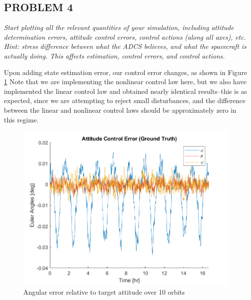 \subsection{PROBLEM 4}
\textit{Start plotting all the relevant quantities of your simulation, including attitude determination errors, attitude control errors, control actions (along all axes), etc. Hint: stress difference between what the ADCS believes, and what the spacecraft is actually doing. This affects estimation, control errors, and control actions.}

Upon adding state estimation error, our control error changes, as shown in Figure \ref{fig:ps9_problem3_controlError_nonlinear} Note that we are implementing the nonlinear control law here, but we also have implemented the linear control law and obtained nearly identical results–this is as expected, since we are attempting to reject small disturbances, and the difference between the linear and nonlinear control laws should be approximately zero in this regime.

\begin{figure}[H]
\centering
\includegraphics[scale=0.7]{Images/ps9_problem3_controlError_nonlinear.png}
\caption{Angular error relative to target attitude over 10 orbits}
\label{fig:ps9_problem3_controlError_nonlinear}
\end{figure}

